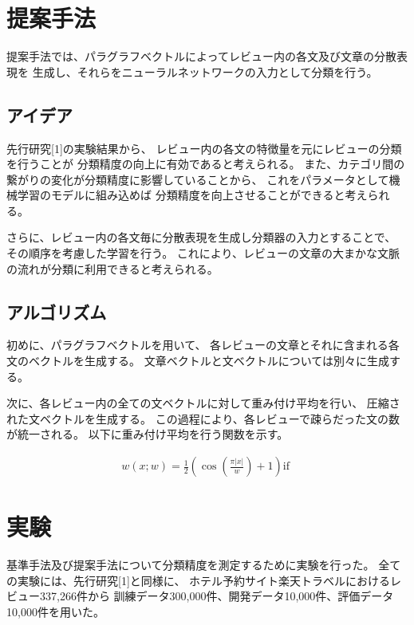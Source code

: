\documentclass[11pt,a4paper]{ltjsarticle}
\begin{document}
\section{提案手法}\label{ux63d0ux6848ux624bux6cd5}

提案手法では、パラグラフベクトルによってレビュー内の各文及び文章の分散表現を
生成し、それらをニューラルネットワークの入力として分類を行う。

\subsection{アイデア}\label{ux30a2ux30a4ux30c7ux30a2}

先行研究{[}1{]}の実験結果から、
レビュー内の各文の特徴量を元にレビューの分類を行うことが
分類精度の向上に有効であると考えられる。
また、カテゴリ間の繋がりの変化が分類精度に影響していることから、
これをパラメータとして機械学習のモデルに組み込めば
分類精度を向上させることができると考えられる。

さらに、レビュー内の各文毎に分散表現を生成し分類器の入力とすることで、
その順序を考慮した学習を行う。
これにより、レビューの文章の大まかな文脈の流れが分類に利用できると考えられる。

\subsection{アルゴリズム}

初めに、パラグラフベクトルを用いて、
各レビューの文章とそれに含まれる各文のベクトルを生成する。
文章ベクトルと文ベクトルについては別々に生成する。

次に、各レビュー内の全ての文ベクトルに対して重み付け平均を行い、
圧縮された文ベクトルを生成する。
この過程により、各レビューで疎らだった文の数が統一される。
以下に重み付け平均を行う関数を示す。

\begin{gather}
w(x; w) = \frac{1}{2} (\cos(\frac{\pi |x|}{w}) + 1) \text{if $$}
\end{gather}



\section{実験}

基準手法及び提案手法について分類精度を測定するために実験を行った。
全ての実験には、先行研究{[}1{]}と同様に、
ホテル予約サイト楽天トラベルにおけるレビュー337,266件から
訓練データ300,000件、開発データ10,000件、評価データ10,000件を用いた。
\end{document}

